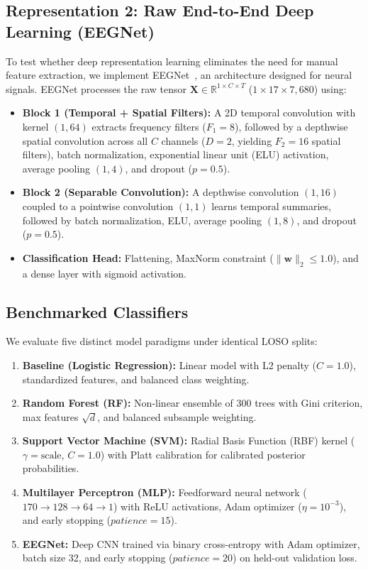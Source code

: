 \documentclass[10pt,journal,compsoc]{IEEEtran}
\begin{document}
\subsection{Representation 2: Raw End-to-End Deep Learning (EEGNet)}
To test whether deep representation learning eliminates the need for manual feature extraction, we implement EEGNet~\cite{lawhern2018eegnet}, an architecture designed for neural signals. EEGNet processes the raw tensor $\mathbf{X} \in \mathbb{R}^{1 \times C \times T}$ ($1 \times 17 \times 7{,}680$) using:
\begin{itemize}
    \item \textbf{Block 1 (Temporal + Spatial Filters):} A 2D temporal convolution with kernel $(1, 64)$ extracts frequency filters ($F_1 = 8$), followed by a depthwise spatial convolution across all $C$ channels ($D=2$, yielding $F_2 = 16$ spatial filters), batch normalization, exponential linear unit (ELU) activation, average pooling $(1, 4)$, and dropout ($p=0.5$).
    \item \textbf{Block 2 (Separable Convolution):} A depthwise convolution $(1, 16)$ coupled to a pointwise convolution $(1, 1)$ learns temporal summaries, followed by batch normalization, ELU, average pooling $(1, 8)$, and dropout ($p=0.5$).
    \item \textbf{Classification Head:} Flattening, MaxNorm constraint ($\|\mathbf{w}\|_2 \le 1.0$), and a dense layer with sigmoid activation.
\end{itemize}

\subsection{Benchmarked Classifiers}
We evaluate five distinct model paradigms under identical LOSO splits:
\begin{enumerate}
    \item \textbf{Baseline (Logistic Regression):} Linear model with L2 penalty ($C=1.0$), standardized features, and balanced class weighting.
    \item \textbf{Random Forest (RF):} Non-linear ensemble of $300$ trees with Gini criterion, max features $\sqrt{d}$, and balanced subsample weighting.
    \item \textbf{Support Vector Machine (SVM):} Radial Basis Function (RBF) kernel ($\gamma = \text{scale}$, $C=1.0$) with Platt calibration for calibrated posterior probabilities.
    \item \textbf{Multilayer Perceptron (MLP):} Feedforward neural network ($170 \to 128 \to 64 \to 1$) with ReLU activations, Adam optimizer ($\eta = 10^{-3}$), and early stopping ($patience=15$).
    \item \textbf{EEGNet:} Deep CNN trained via binary cross-entropy with Adam optimizer, batch size 32, and early stopping ($patience=20$) on held-out validation loss.
\end{enumerate}
\end{document}
